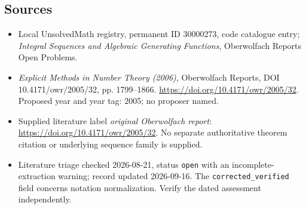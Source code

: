 \documentclass[11pt]{article}
\begin{document}
\subsection{Sources}
\begin{itemize}\item Local UnsolvedMath registry, permanent ID 30000273, code catalogue entry; \emph{Integral Sequences and Algebraic Generating Functions}, Oberwolfach Reports Open Problems.\item \emph{Explicit Methods in Number Theory (2006)}, Oberwolfach Reports, DOI 10.4171/owr/2005/32, pp. 1799--1866. \url{https://doi.org/10.4171/owr/2005/32}. Proposed year and year tag: 2005; no proposer named.\item Supplied literature label \emph{original Oberwolfach report}: \url{https://doi.org/10.4171/owr/2005/32}. No separate authoritative theorem citation or underlying sequence family is supplied.\item Literature triage checked 2026-08-21, status \texttt{open} with an incomplete-extraction warning; record updated 2026-09-16. The \texttt{corrected\_verified} field concerns notation normalization. Verify the dated assessment independently.\end{itemize}
\end{document}
